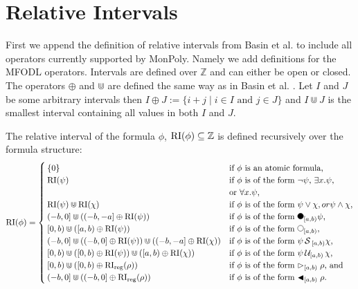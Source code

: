 \section{Relative Intervals}

First we append the definition of relative intervals from Basin et al. \cite{Basin2016} to include all operators currently supported by MonPoly.
Namely we add definitions for the MFODL operators.
Intervals are defined over $\mathbb{Z}$ and can either be open or closed.
The operators $\oplus$ and $\Cup$ are defined the same way as in Basin et al. \cite{Basin2016}.
Let $I$ and $J$ be some arbitrary intervals then $I \oplus J := \{i+j \mid i \in I \text{ and } j \in J\}$ and $I \Cup J$ is the smallest interval containing all values in both $I$ and $J$.

\begin{definition} 
    \label{def:rel-int}
    The relative interval of the formula $\phi$, $\operatorname{RI}(\phi) \subseteq \mathbb{Z}$ is defined recursively over the formula structure: 
    \begin{equation*}
        \RI(\phi) =
        \begin{cases}
            \{0\}     & \text{if $\phi$ is an atomic formula,} \\ 
            \RI(\psi) & \text{if $\phi$ is of the form $\neg \psi$, 
                                $\exists x.\psi$,} \\ &\text{or $\forall x.\psi$,} \\
            \RI(\psi) \Cup \RI(\chi) & \text{if $\phi$ is of the form $\psi \lor \chi, or
                                            \psi \land \chi$,} \\
            (-b,0] \Cup ((-b,-a] \oplus \RI(\psi)) & \text{if $\phi$ is of the form $\Previous{[a,b)}\psi$,} \\
            [0,b) \Cup ([a,b) \oplus \RI(\psi)) & \text{if $\phi$ is of the form $\Next{[a,b)}$,}\\
            (-b,0] \Cup ((-b,0] \oplus \RI(\psi)) \Cup ((-b,-a] \oplus \RI(\chi)) & \text{if $\phi$ is of the form $\psi \Since{}_{[a,b)} \chi$,} \\
            [0,b) \Cup ([0,b) \oplus \RI(\psi)) \Cup ([a,b) \oplus \RI(\chi)) & \text{if $\phi$ is of the form $\psi \Until{[a,b)} \chi$,} \\
            [0,b) \Cup ([0,b) \oplus \RIr(\rho)) & \text{if $\phi$ is of the form $\Fregex{[a,b)} \rho$, and}\\
            (-b,0] \Cup ((-b,0] \oplus \RIr(\rho)) & \text{if $\phi$ is of the form $\Pregex{[a,b)} \rho$.}\\
        \end{cases}
    \end{equation*}
\end{definition}

